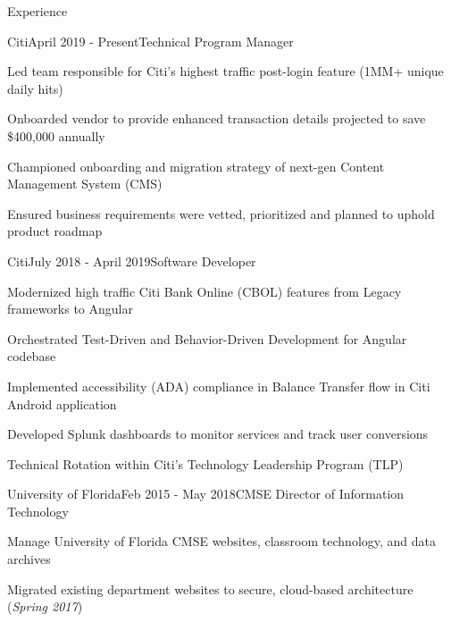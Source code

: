 \documentclass{resume} %
\begin{document}
\begin{rSection}{Experience}

\begin{rSubsection}{Citi}{April 2019 - Present}{Technical Program Manager}{}
\setlength{\itemindent}{.25in}
\item Led team responsible for Citi's highest traffic post-login feature (1MM+ unique daily hits)
\item Onboarded vendor to provide enhanced transaction details projected to save \$400,000 annually
\item Championed onboarding and migration strategy of next-gen Content Management System (CMS)
\item Ensured business requirements were vetted, prioritized and planned to uphold product roadmap
\end{rSubsection}

\begin{rSubsection}{Citi}{July 2018 - April 2019}{Software Developer}{}
\setlength{\itemindent}{.25in}
\item Modernized high traffic Citi Bank Online (CBOL) features from Legacy frameworks to Angular
\item Orchestrated Test-Driven and Behavior-Driven Development for Angular codebase
\item Implemented accessibility (ADA) compliance in Balance Transfer flow in Citi Android application
\item Developed Splunk dashboards to monitor services and track user conversions
\item Technical Rotation within Citi's Technology Leadership Program (TLP)
\end{rSubsection}

\begin{rSubsection}{University of Florida}{Feb 2015 - May 2018}{CMSE Director of Information Technology}{}
\setlength{\itemindent}{.25in}
\item Manage University of Florida CMSE websites, classroom technology, and data archives
\item Migrated existing department websites to secure, cloud-based architecture (\textit{Spring 2017})
\end{rSubsection}



\end{rSection}
\end{document}
